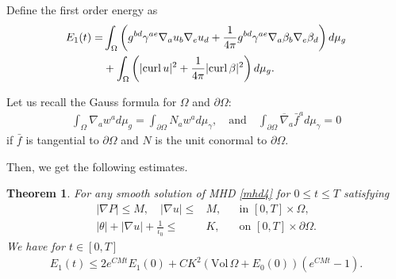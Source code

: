 \documentclass[12pt,reqno]{amsart}
\numberwithin{equation}{section}
\newtheorem{theorem}{Theorem}[section]
\theoremstyle{definition}
\theoremstyle{remark}
\begin{document}
Define the first order energy as
\begin{align}\label{energy.1}
   E_1(t)=&\int_\Omega \left(g^{bd}\gamma^{ae}{\nabla}_a u_b{\nabla}_e u_d+\frac{1}{4\pi}g^{bd}\gamma^{ae}{\nabla}_a \beta_b{\nabla}_e \beta_d\right)d\mu_g{\nonumber}\\
   &+\int_\Omega\left(|{\mathrm{curl}\,} u|^2+\frac{1}{4\pi}|{\mathrm{curl}\,} \beta|^2\right)d\mu_g.
\end{align}

Let us recall the Gauss formula for $\Omega$ and ${\partial}\Omega$:
\begin{align}\label{Gauss}
  \int_\Omega {\nabla}_a w^a d\mu_g=\int_{{\partial}\Omega} N_a w^a d\mu_\gamma, \quad \text{and} \quad \int_{{\partial}\Omega}{\overline{\nabla}}_a\bar{f}^a d\mu_\gamma =0
\end{align}
if $\bar{f}$ is tangential to ${\partial}\Omega$ and $N$ is the unit conormal to ${\partial}\Omega$.

Then, we get the following estimates.

\begin{theorem}\label{thm.1energy}
  For any smooth solution of MHD \eqref{mhd4} for $0{\leqslant} t{\leqslant} T$ satisfying
  \begin{align}
    |{\nabla} {P }|{\leqslant} M, \quad |{\nabla} u|{\leqslant}& M,  &&\text{in } [0,T]\times \Omega,\\
    |\theta|+|{\nabla} u|+\frac{1}{\iota_0}{\leqslant} &K,&&\text{on } [0,T]\times {\partial}\Omega. \label{eq.1energy1.1}
  \end{align}
  We have for $t\in[0,T]$
  \begin{align}
    E_1(t){\leqslant} 2e^{CMt}E_1(0)+C K^2\left({\mathrm{Vol}\,}\Omega+ E_0(0)\right)\left(e^{CMt}-1\right).
  \end{align}
\end{theorem}
\end{document}
